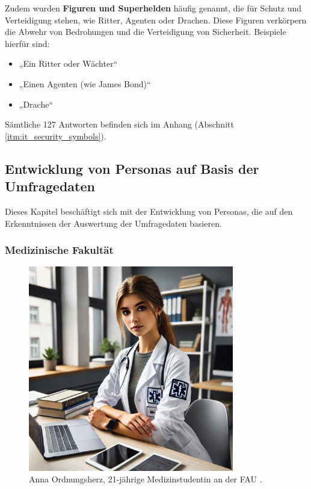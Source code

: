 \documentclass[german,report]{i1thesis}
\begin{document}
Zudem wurden \textbf{Figuren und Superhelden} häufig genannt, die für Schutz und Verteidigung stehen, wie Ritter, Agenten oder Drachen. Diese Figuren verkörpern die Abwehr von Bedrohungen und die Verteidigung von Sicherheit. Beispiele hierfür sind:
\begin{itemize}
    \item „Ein Ritter oder Wächter“
    \item „Einen Agenten (wie James Bond)“
    \item „Drache“
\end{itemize}

Sämtliche 127 Antworten befinden sich im Anhang (Abschnitt \ref{itm:it_security_symbols}).

\newpage

\subsection{Entwicklung von Personas auf Basis der Umfragedaten}
\label{sec:creation_of_personas}

Dieses Kapitel beschäftigt sich mit der Entwicklung von Personas, die auf den Erkenntnissen der Auswertung der Umfragedaten basieren.

\subsubsection{Medizinische Fakultät}

\begin{figure}[H]
\centering
\includegraphics[width=0.8\textwidth]{images/anna_mueller.pdf}
\caption{Anna Ordnungsherz, 21-jährige Medizinstudentin an der FAU \cite{chatgpt2024annamüller}.}
\label{fig}
\end{figure}
\end{document}
